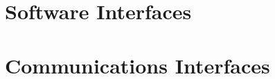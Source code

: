 \section{Software Interfaces}
	\begin{comment}
		$<$Describe the connections between this product and other specific software 
		components (name and version), including databases, operating systems, tools, 
		libraries, and integrated commercial components. Identify the data items or 
		messages coming into the system and going out and describe the purpose of each.  
		Describe the services needed and the nature of communications. Refer to 
		documents that describe detailed application programming interface protocols.  
		Identify data that will be shared across software components. If the data 
		sharing mechanism must be implemented in a specific way (for example, use of a 
		global data area in a multitasking operating system), specify this as an 
		implementation constraint.$>$
	\end{comment}

\section{Communications Interfaces}
	\begin{comment}
		$<$Describe the requirements associated with any communications functions 
		required by this product, including e-mail, web browser, network server 
		communications protocols, electronic forms, and so on. Define any pertinent 
		message formatting. Identify any communication standards that will be used, such 
		as FTP or HTTP. Specify any communication security or encryption issues, data 
		transfer rates, and synchronization mechanisms.$>$
	\end{comment}